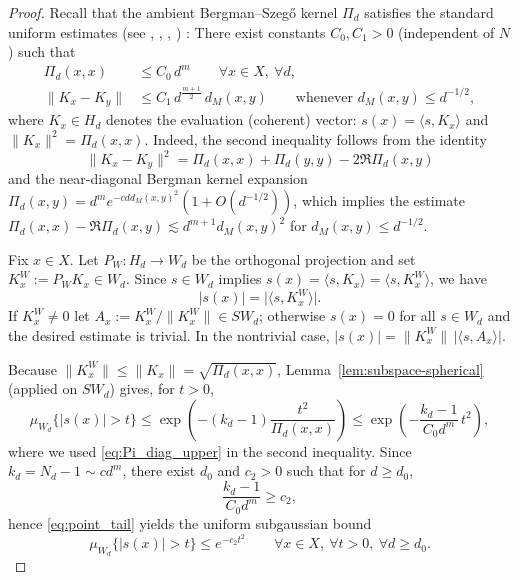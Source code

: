 \documentclass [11pt]{amsart}
\theoremstyle{remark}
\numberwithin{equation}{section}
\numberwithin{theorem}{section}
\begin{document}
\begin{proof}
Recall that the ambient Bergman--Szeg\H{o} kernel $\Pi_d$ satisfies the standard uniform estimates (see \cite{Ca}, \cite{Ch}, \cite{SZ2}, \cite{Ze}) :
There exist constants $C_0,C_1>0$ (independent of $N$) such that
\begin{align}
\Pi_d(x,x) &\le C_0\,d^m \qquad \forall x\in X,\ \forall d, \label{eq:Pi_diag_upper}\\
\|K_x-K_y\| &\le C_1\,d^{\frac{m+1}{2}}\,d_M(x,y)
\qquad \text{whenever } d_M(x,y)\le d^{-1/2}, \label{eq:K_Lipschitz}
\end{align}
where $K_x\in H_d$ denotes the evaluation (coherent) vector: $s(x)=\langle s, K_x\rangle$ and $\|K_x\|^2=\Pi_d(x,x)$. Indeed, the second inequality follows from the identity
$$\|K_x-K_y\|^2=\Pi_d(x,x)+\Pi_d(y,y)-2\Re\Pi_d(x,y)$$
and the near-diagonal Bergman kernel expansion
$\Pi_d(x,y)=d^m e^{-cd d_{M}(x,y)^2}(1+O(d^{-1/2}))$,
which implies the estimate
$\Pi_d(x,x)-\Re\Pi_d(x,y)\lesssim d^{m+1}d_{M}(x,y)^2$
for $d_{M}(x,y)\le d^{-1/2}$.

Fix $x\in X$. Let $P_W:H_d\to W_d$ be the orthogonal projection and set
\(
K_x^W:=P_W K_x\in W_d.
\)
Since $s\in W_d$ implies $s(x)=\langle s, K_x\rangle=\langle s, K_x^W\rangle $, we have
\[
|s(x)| = \big|\langle s, K_x^W\rangle \big|.
\]
If $K_x^W\neq 0$ let $\displaystyle{A_x:=K_x^W/\|K_x^W\|\in SW_d}$; otherwise $s(x)=0$ for all $s\in W_d$ and the desired 
estimate is trivial. In the nontrivial case,
\(
|s(x)| = \|K_x^W\|\,|\langle s,A_x\rangle |.
\)

Because $\|K_x^W\|\le \|K_x\|=\sqrt{\Pi_d(x,x)}$, Lemma~\ref{lem:subspace-spherical} (applied on $SW_d$)
gives, for $t>0$,
\begin{equation}\label{eq:point_tail}
\mu_{W_d}\big\{|s(x)|>t\big\}
\le
\exp\!\left(-(k_d-1)\frac{t^2}{\Pi_d(x,x)}\right)
\le
\exp\!\left(-\frac{k_d-1}{C_0 d^m}\,t^2\right),
\end{equation}
where we used \eqref{eq:Pi_diag_upper} in the second inequality.
Since $k_d=N_{d}-1\sim c d^m$, there exist $d_0$ and $c_2>0$ such that for $d\ge d_0$,
\[
\frac{k_d-1}{C_0 d^m}\ge c_2,
\]
hence \eqref{eq:point_tail} yields the uniform subgaussian bound
\begin{equation}\label{eq:point_tail_simple}
\mu_{W_d}\big\{|s(x)|>t\big\}\le e^{-c_2 t^2}\qquad \forall x\in X,\ \forall t>0,\ \forall d\ge d_0.
\end{equation}


\end{proof}
\end{document}
